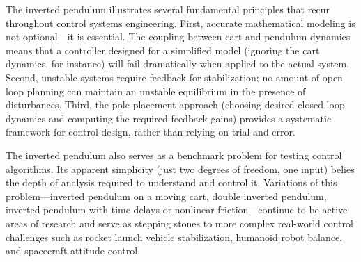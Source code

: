 The inverted pendulum illustrates several fundamental principles that recur throughout control systems engineering. First, accurate mathematical modeling is not optional—it is essential. The coupling between cart and pendulum dynamics means that a controller designed for a simplified model (ignoring the cart dynamics, for instance) will fail dramatically when applied to the actual system. Second, unstable systems require feedback for stabilization; no amount of open-loop planning can maintain an unstable equilibrium in the presence of disturbances. Third, the pole placement approach (choosing desired closed-loop dynamics and computing the required feedback gains) provides a systematic framework for control design, rather than relying on trial and error.

The inverted pendulum also serves as a benchmark problem for testing control algorithms. Its apparent simplicity (just two degrees of freedom, one input) belies the depth of analysis required to understand and control it. Variations of this problem—inverted pendulum on a moving cart, double inverted pendulum, inverted pendulum with time delays or nonlinear friction—continue to be active areas of research and serve as stepping stones to more complex real-world control challenges such as rocket launch vehicle stabilization, humanoid robot balance, and spacecraft attitude control.
